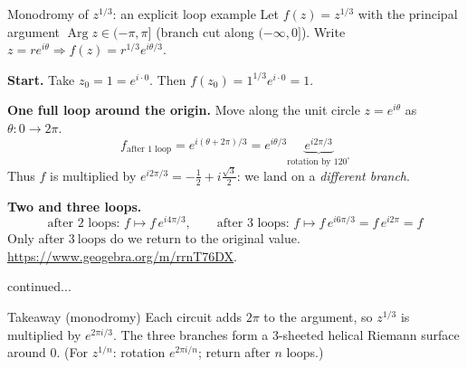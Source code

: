 \documentclass[11pt]{beamer}
\theoremstyle{plain}
\newcommand{\Arg}{\operatorname{Arg}}
\begin{document}
\begin{frame}{Monodromy of \(z^{1/3}\): an explicit loop example}
Let \(f(z)=z^{1/3}\) with the principal argument \(\Arg z\in(-\pi,\pi]\) (branch cut along \((-\infty,0]\)).  
Write \(z=re^{i\theta}\Rightarrow f(z)=r^{1/3}e^{i\theta/3}\).

\medskip
\textbf{Start.} Take \(z_0=1=e^{i\cdot 0}\). Then \(f(z_0)=1^{1/3}e^{i\cdot 0}=1\).

\medskip
\textbf{One full loop around the origin.} Move along the unit circle \(z=e^{i\theta}\) as \(\theta:0\to 2\pi\).
\[
f_{\text{after 1 loop}}=e^{i(\theta+2\pi)/3}=e^{i\theta/3}\underbrace{e^{i2\pi/3}}_{\text{rotation by }120^\circ}
\]
Thus \(f\) is multiplied by \(e^{i2\pi/3}=-\tfrac12+i\tfrac{\sqrt{3}}{2}\): we land on a \emph{different branch}.

\medskip
\textbf{Two and three loops.}
\[
\text{after 2 loops: } f\mapsto f\,e^{i4\pi/3},\qquad
\text{after 3 loops: } f\mapsto f\,e^{i6\pi/3}=f\,e^{i2\pi}=f
\]
Only after \(\boxed{3\ \text{loops}}\) do we return to the original value. \url{https://www.geogebra.org/m/rrnT76DX}. 

\medskip
\end{frame}



\begin{frame}{continued...}
    \begin{block}{Takeaway (monodromy)}
Each circuit adds \(2\pi\) to the argument, so \(z^{1/3}\) is multiplied by \(e^{2\pi i/3}\).  
The three branches form a 3-sheeted helical Riemann surface around \(0\).  
(For \(z^{1/n}\): rotation \(e^{2\pi i/n}\); return after \(n\) loops.)
\end{block}
\end{frame}
\end{document}
